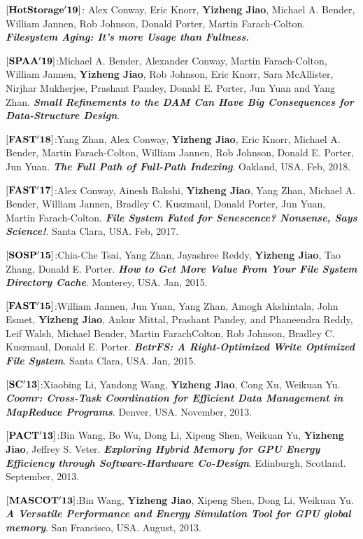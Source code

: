 \documentclass[margin, 10pt]{res} %
\begin{document}
\begin{resume}
$[\bf{HotStorage'19}]$:
Alex Conway, Eric Knorr, \textbf{Yizheng Jiao}, Michael A. Bender, William Jannen, Rob Johnson, Donald Porter, Martin Farach-Colton.
\textbf{\textit{Filesystem Aging: It’s more Usage than Fullness.}}


$[\bf{SPAA'19}]$:Michael A. Bender, Alexander Conway, Martin Farach-Colton, William Jannen,
\textbf{Yizheng Jiao}, Rob Johnson, Eric Knorr, Sara McAllister, Nirjhar
Mukherjee, Prashant Pandey, Donald E. Porter, Jun Yuan and Yang Zhan. \textbf{\textit{Small Refinements to the DAM Can Have Big Consequences for
Data-Structure Design}}.

$[\bf{FAST'18}]$:Yang Zhan, Alex Conway, \textbf{Yizheng Jiao}, Eric Knorr, Michael A. Bender, Martin Farach-Colton, William Jannen, Rob Johnson, Donald E. Porter, Jun Yuan.
\textbf{\textit{The Full Path of Full-Path Indexing}}. 
Oakland, USA. Feb, 2018.

$[\bf{FAST'17}]$:Alex Conway, Ainesh Bakshi, \textbf{Yizheng Jiao}, Yang Zhan, Michael A. Bender, William Jannen, Bradley C. Kuszmaul, Donald Porter, Jun Yuan, Martin Farach-Colton.
\textbf{\textit{File System Fated for Senescence? Nonsense, Says Science!}}. 
Santa Clara, USA. Feb, 2017.

$[\bf{SOSP'15}]$:Chia-Che Tsai, Yang Zhan, Jayashree Reddy, \textbf{Yizheng Jiao}, Tao Zhang, Donald E. Porter. \textbf{\textit{How to Get More Value From Your File System Directory Cache}}. Monterey, USA. Jan, 2015.

$[\bf{FAST'15}]$:William Jannen, Jun Yuan, Yang Zhan, Amogh Akshintala, John Esmet, \textbf{Yizheng Jiao}, Ankur Mittal, Prashant Pandey, and Phaneendra Reddy, Leif Walsh, Michael Bender, Martin FarachColton, Rob Johnson, Bradley C. Kuszmaul, Donald E. Porter. \textbf{\textit{BetrFS: A Right-Optimized Write Optimized File System}}. Santa Clara, USA. Jan, 2015.

$[\bf{SC'13}]$:Xiaobing Li, Yandong Wang, \textbf{Yizheng Jiao}, Cong Xu, Weikuan Yu. \textbf{\textit{Coomr: Cross-Task Coordination for Efficient Data Management in MapReduce Programs}}. Denver, USA. November, 2013.

$[\bf{PACT'13}]$:Bin Wang, Bo Wu, Dong Li, Xipeng Shen, Weikuan Yu, \textbf{Yizheng Jiao}, Jeffrey S. Veter. \textbf{\textit{Exploring Hybrid Memory for GPU Energy Efficiency through Software-Hardware Co-Design}}. Edinburgh, Scotland. September, 2013.

$[\bf{MASCOT'13}]$:Bin Wang, \textbf{Yizheng Jiao}, Xipeng Shen, Dong Li, Weikuan Yu.
\textbf{\textit{A Versatile Performance and Energy Simulation Tool for GPU global memory}}.
San Francisco, USA. August, 2013.


\end{resume}
\end{document}
